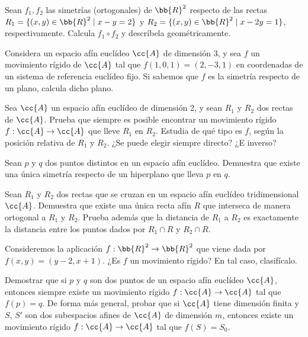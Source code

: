 \begin{ejercicio}
    Sean $f_1, f_2$ las simetrías (ortogonales) de $\bb{R}^2$ respecto de las rectas $R_1 = \{(x, y) \in \bb{R}^2 \mid x - y = 2\}$ y $R_2=\{(x, y) \in \bb{R}^2 \mid x - 2y = 1\}$, respectivamente. Calcula $f_1 \circ f_2$ y descríbela geométricamente.
\end{ejercicio}

\begin{ejercicio}
    Considera un espacio afín euclídeo $\cc{A}$ de dimensión 3, y sea $f$ un movimiento rígido de $\cc{A}$ tal que $f(1, 0, 1) = (2, -3, 1)$ en coordenadas de un sistema de referencia euclídeo fijo. Si sabemos que $f$ es la simetría respecto de un plano, calcula dicho plano.
\end{ejercicio}

\begin{ejercicio}
    Sea $\cc{A}$ un espacio afín euclídeo de dimensión 2, y sean $R_1$ y $R_2$ dos rectas de $\cc{A}$. Prueba que siempre es posible encontrar un movimiento rígido $f : \cc{A} \to \cc{A}$ que lleve $R_1$ en $R_2$. Estudia de qué tipo es $f$, según la posición relativa de $R_1$ y $R_2$. ¿Se puede elegir siempre directo? ¿E inverso?
\end{ejercicio}

\begin{ejercicio}
    Sean $p$ y $q$ dos puntos distintos en un espacio afín euclídeo. Demuestra que existe una única simetría respecto de un hiperplano que lleva $p$ en $q$.
\end{ejercicio}

\begin{ejercicio}
     Sean $R_1$ y $R_2$ dos rectas que se cruzan en un espacio afín euclídeo tridimensional $\cc{A}$. Demuestra que existe una única recta afín $R$ que interseca de manera ortogonal a $R_1$ y $R_2$. Prueba además que la distancia de $R_1$ a $R_2$ es exactamente la distancia entre los puntos dados por $R_1 \cap R$ y $R_2 \cap R$.
\end{ejercicio}

\begin{ejercicio}
    Consideremos la aplicación $f : \bb{R}^2 \to \bb{R}^2$ que viene dada por $f(x, y) = (y -2, x+ 1)$. ¿Es $f$ un movimiento rígido? En tal caso, clasifícalo.
\end{ejercicio}

\begin{ejercicio}
     Demostrar que si $p$ y $q$ son dos puntos de un espacio afín euclídeo $\cc{A}$, entonces siempre existe un movimiento rígido $f : \cc{A} \to \cc{A}$ tal que $f(p) = q$. De forma más general, probar que si $\cc{A}$ tiene dimensión finita y $S$, $S'$ son dos subespacios afines de $\cc{A}$ de dimensión $m$, entonces existe un movimiento rígido $f : \cc{A} \to \cc{A}$ tal que $f(S) = S_0$.
\end{ejercicio}

